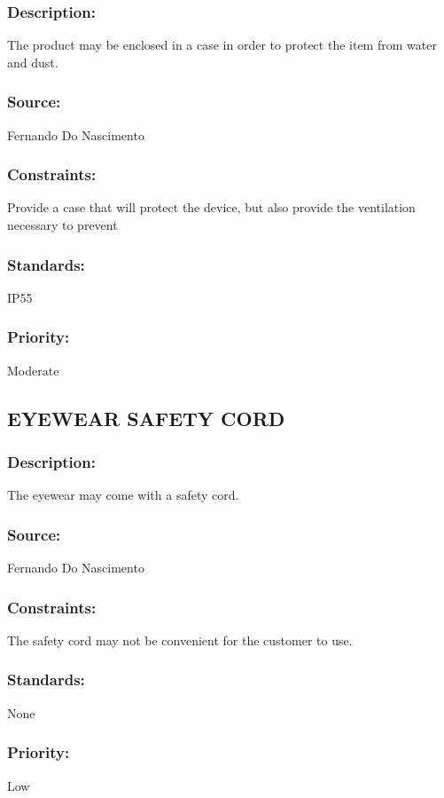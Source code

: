 \subsubsection{Description:} 
	{The product may be enclosed in a case in order to protect the item from water and dust.}
\subsubsection{Source:} 
	{Fernando Do Nascimento}
\subsubsection{Constraints:} 
	{Provide a case that will protect the device, but also provide the ventilation necessary to prevent}
\subsubsection{Standards:}
	{ IP55}
\subsubsection{Priority:}
	{ Moderate}
\newline

\subsection{\text EYEWEAR SAFETY CORD}
\subsubsection{Description:} 
	{The eyewear may come with a safety cord.}
\subsubsection{Source:} 
	{Fernando Do Nascimento}
\subsubsection{Constraints:}
	{The safety cord may not be convenient for the customer to use.}
\subsubsection{Standards:} 
	{None}
\subsubsection{Priority:}
	{Low}
\newline

